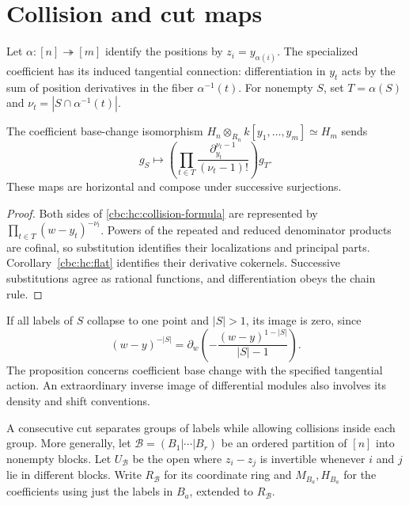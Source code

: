 \section{Collision and cut maps}
\label{cbc:hc:collision-cuts}

Let $\alpha:[n]\twoheadrightarrow[m]$ identify the positions
by $z_i=y_{\alpha(i)}$. The specialized coefficient has its
induced tangential connection: differentiation in $y_t$
acts by the sum of position derivatives in the fiber
$\alpha^{-1}(t)$. For nonempty $S$, set
$T=\alpha(S)$ and $\nu_t=|S\cap\alpha^{-1}(t)|$.

\begin{proposition}\label{cbc:hc:collisions}
The coefficient base-change isomorphism
$H_n\otimes_{R_n}k[y_1,\ldots,y_m]\simeq H_m$ sends
\begin{equation}\label{cbc:hc:collision-formula}
 g_S\longmapsto
 \left(\prod_{t\in T}
       \frac{\partial_{y_t}^{\nu_t-1}}{(\nu_t-1)!}\right)g_T.
\end{equation}
These maps are horizontal and compose under successive
surjections.
\end{proposition}

\begin{proof}
Both sides of \eqref{cbc:hc:collision-formula} are represented
by $\prod_{t\in T}(w-y_t)^{-\nu_t}$. Powers of the repeated
and reduced denominator products are cofinal, so substitution
identifies their localizations and principal parts.
Corollary~\ref{cbc:hc:flat} identifies their derivative
cokernels. Successive substitutions agree as rational
functions, and differentiation obeys the chain rule.
\end{proof}

If all labels of $S$ collapse to one point and $|S|>1$, its
image is zero, since
\[
 (w-y)^{-|S|}
 =\partial_w\left(-\frac{(w-y)^{1-|S|}}{|S|-1}\right).
\]
The proposition concerns coefficient base change with the
specified tangential action. An extraordinary inverse image
of differential modules also involves its density and shift
conventions.

A consecutive cut separates groups of labels while allowing
collisions inside each group. More generally, let
$\mathcal B=(B_1|\cdots|B_r)$ be an ordered partition of
$[n]$ into nonempty blocks. Let $U_{\mathcal B}$ be the open
where $z_i-z_j$ is invertible whenever $i$ and $j$ lie in
different blocks. Write $R_{\mathcal B}$ for its coordinate
ring and $M_{B_a},H_{B_a}$ for the coefficients using just
the labels in $B_a$, extended to $R_{\mathcal B}$.

